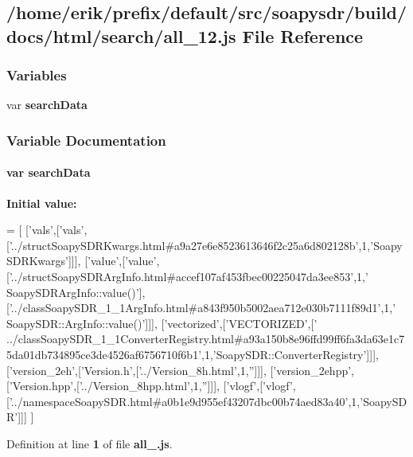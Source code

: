 \subsection{/home/erik/prefix/default/src/soapysdr/build/docs/html/search/all\+\_\+12.js File Reference}
\label{all__12_8js}
\subsubsection*{Variables}
\begin{DoxyCompactItemize}
\item 
var {\bf search\+Data}
\end{DoxyCompactItemize}


\subsubsection{Variable Documentation}
\paragraph[{search\+Data}]{\setlength{\rightskip}{0pt plus 5cm}var search\+Data}\label{all__12_8js_ad01a7523f103d6242ef9b0451861231e}
{\bfseries Initial value\+:}
\begin{DoxyCode}
=
[
  [\textcolor{stringliteral}{'vals'},[\textcolor{stringliteral}{'vals'},[\textcolor{stringliteral}{'../structSoapySDRKwargs.html#a9a27e6e8523613646f2c25a6d802128b'},1,\textcolor{stringliteral}{'SoapySDRKwargs'}]]],
  [\textcolor{stringliteral}{'value'},[\textcolor{stringliteral}{'value'},[\textcolor{stringliteral}{'../structSoapySDRArgInfo.html#accef107af453fbec00225047da3ee853'},1,\textcolor{stringliteral}{'
      SoapySDRArgInfo::value()'}],[\textcolor{stringliteral}{'../classSoapySDR\_1\_1ArgInfo.html#a843f950b5002aea712e030b7111f89d1'},1,\textcolor{stringliteral}{'
      SoapySDR::ArgInfo::value()'}]]],
  [\textcolor{stringliteral}{'vectorized'},[\textcolor{stringliteral}{'VECTORIZED'},[\textcolor{stringliteral}{'
      ../classSoapySDR\_1\_1ConverterRegistry.html#a93a150b8e96ffd99ff6fa3da63e1c75da01db734895ce3de4526af6756710f6b1'},1,\textcolor{stringliteral}{'SoapySDR::ConverterRegistry'}]]],
  [\textcolor{stringliteral}{'version\_2eh'},[\textcolor{stringliteral}{'Version.h'},[\textcolor{stringliteral}{'../Version\_8h.html'},1,\textcolor{stringliteral}{''}]]],
  [\textcolor{stringliteral}{'version\_2ehpp'},[\textcolor{stringliteral}{'Version.hpp'},[\textcolor{stringliteral}{'../Version\_8hpp.html'},1,\textcolor{stringliteral}{''}]]],
  [\textcolor{stringliteral}{'vlogf'},[\textcolor{stringliteral}{'vlogf'},[\textcolor{stringliteral}{'../namespaceSoapySDR.html#a0b1e9d955ef43207dbc00b74aed83a40'},1,\textcolor{stringliteral}{'SoapySDR'}]]]
]
\end{DoxyCode}


Definition at line {\bf 1} of file {\bf all\+\_.\+js}.

